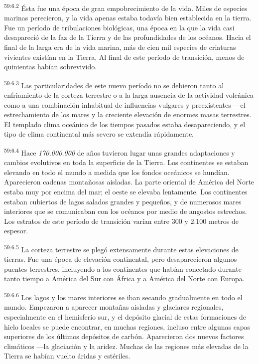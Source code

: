 \par
\textsuperscript{59:6.2} Ésta fue una época de gran empobrecimiento de la vida. Miles de especies marinas perecieron, y la vida apenas estaba todavía bien establecida en la tierra. Fue un período de tribulaciones biológicas, una época en la que la vida casi desapareció de la faz de la Tierra y de las profundidades de los océanos. Hacia el final de la larga era de la vida marina, más de cien mil especies de criaturas vivientes existían en la Tierra. Al final de este período de transición, menos de quinientas habían sobrevivido.

\par
\textsuperscript{59:6.3} Las particularidades de este nuevo período no se debieron tanto al enfriamiento de la corteza terrestre o a la larga ausencia de la actividad volcánica como a una combinación inhabitual de influencias vulgares y preexistentes ---el estrechamiento de los mares y la creciente elevación de enormes masas terrestres. El templado clima oceánico de los tiempos pasados estaba desapareciendo, y el tipo de clima continental más severo se extendía rápidamente.

\par
\textsuperscript{59:6.4} Hace \textit{170.000.000} de años tuvieron lugar unas grandes adaptaciones y cambios evolutivos en toda la superficie de la Tierra. Los continentes se estaban elevando en todo el mundo a medida que los fondos oceánicos se hundían. Aparecieron cadenas montañosas aisladas. La parte oriental de América del Norte estaba muy por encima del mar; el oeste se elevaba lentamente. Los continentes estaban cubiertos de lagos salados grandes y pequeños, y de numerosos mares interiores que se comunicaban con los océanos por medio de angostos estrechos. Los estratos de este período de transición varían entre 300 y 2.100 metros de espesor.

\par
\textsuperscript{59:6.5} La corteza terrestre se plegó extensamente durante estas elevaciones de tierras. Fue una época de elevación continental, pero desaparecieron algunos puentes terrestres, incluyendo a los continentes que habían conectado durante tanto tiempo a América del Sur con África y a América del Norte con Europa.

\par
\textsuperscript{59:6.6} Los lagos y los mares interiores se iban secando gradualmente en todo el mundo. Empezaron a aparecer montañas aisladas y glaciares regionales, especialmente en el hemisferio sur, y el depósito glacial de estas formaciones de hielo locales se puede encontrar, en muchas regiones, incluso entre algunas capas superiores de los últimos depósitos de carbón. Aparecieron dos nuevos factores climáticos ---la glaciación y la aridez. Muchas de las regiones más elevadas de la Tierra se habían vuelto áridas y estériles.

